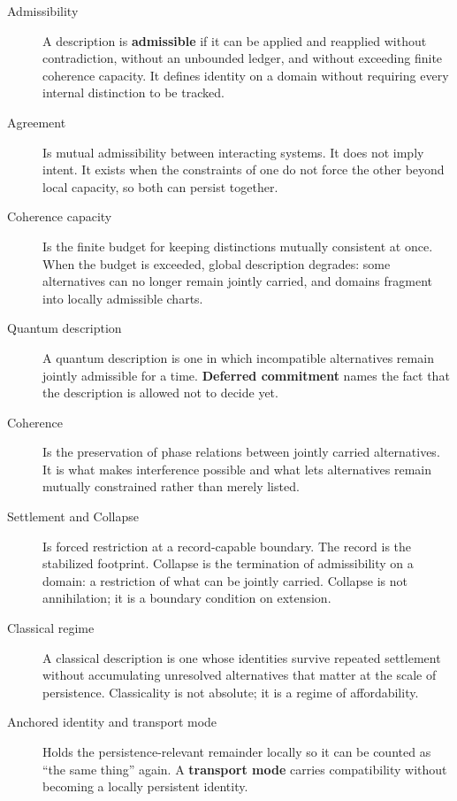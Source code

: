 \documentclass[11pt,twoside,openright]{book}
\begin{document}
\begin{description}
\item[Admissibility] A description is \textbf{admissible} if it can be applied and reapplied
without contradiction, without an unbounded ledger, and without exceeding finite coherence capacity.
It defines identity on a domain without requiring every internal distinction to be tracked.

\item[Agreement] Is mutual admissibility between interacting systems.
It does not imply intent.
It exists when the constraints of one do not force the other beyond local capacity,
so both can persist together.

\item[Coherence capacity] Is the finite budget for keeping distinctions mutually consistent at once.
When the budget is exceeded, global description degrades:
some alternatives can no longer remain jointly carried,
and domains fragment into locally admissible charts.

\item[Quantum description] A quantum description is one in which
incompatible alternatives remain jointly admissible for a time.
\textbf{Deferred commitment} names the fact that the description is allowed not to decide yet.

\item[Coherence] Is the preservation of phase relations between jointly carried alternatives.
It is what makes interference possible and what lets alternatives remain mutually constrained rather than merely listed.

\item[Settlement and Collapse] Is forced restriction at a record-capable boundary.
The record is the stabilized footprint.
Collapse is the termination of admissibility on a domain:
a restriction of what can be jointly carried.
Collapse is not annihilation; it is a boundary condition on extension.

\item[Classical regime] A classical description is one whose identities survive repeated settlement
without accumulating unresolved alternatives that matter at the scale of persistence.
Classicality is not absolute; it is a regime of affordability.

\item[Anchored identity and transport mode] Holds the persistence-relevant remainder locally
so it can be counted as ``the same thing'' again.
A \textbf{transport mode} carries compatibility without becoming a locally persistent identity.
\end{description}
\end{document}
